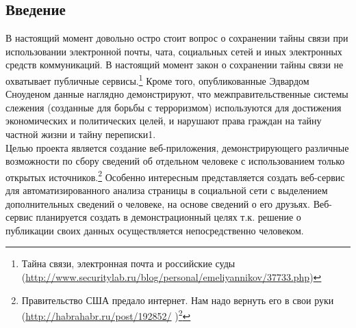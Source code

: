 \begin{chap1} %
\newpage
\tableofcontents
\newpage
\section{Введение}
В настоящий момент довольно остро стоит вопрос о сохранении тайны связи при использовании электронной почты, чата, социальных сетей и иных электронных средств коммуникаций. В настоящий момент  закон о сохранении тайны связи не охватывает публичные сервисы.\footnote{ Тайна связи, электронная почта и российские суды (\url{http://www.securitylab.ru/blog/personal/emeliyannikov/37733.php})}
Кроме того, опубликованные Эдвардом Сноуденом данные наглядно демонстрируют, что межправительственные системы слежения (созданные для борьбы с терроризмом) используются для достижения экономических и политических целей, и нарушают права граждан на тайну частной жизни и тайну переписки1.\\

Целью проекта является создание веб-приложения, демонстрирующего различные возможности по сбору сведений об отдельном человеке с использованием только открытых источников.\footnote{Правительство США предало интернет. Нам надо вернуть его в свои руки     (\url{http://habrahabr.ru/post/192852/} )\footnote{Эдвард Сноуден (\url{http://ru.wikipedia.org/wiki/Сноуден,\_Эдвард})}} 
Особенно интересным представляется создать веб-сервис для автоматизированного анализа страницы в социальной сети с выделением дополнительных сведений о человеке, на основе сведений о его друзьях. Веб-сервис планируется создать в демонстрационный целях т.к. решение о публикации своих данных осуществляется непосредственно человеком.\\


\end{chap1}
